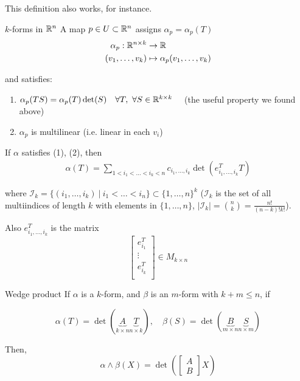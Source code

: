 \documentclass[12pt]{article}
\begin{document}
This definition also works, for instance.

\begin{definition}{$k$-forms in $\mathbb{R}^n$}{}
    A map $p \in U \subset \mathbb{R}^n$ assigns $\alpha_p = \alpha_p(T)$
    \begin{align*}
        \alpha_p: \mathbb{R}^{n \times k} &\rightarrow \mathbb{R} \\
        (v_1,\dots,v_k) &\mapsto \alpha_p(v_1,\dots,v_k) 
    \end{align*}

    and satisfies:
    \begin{enumerate}
        \item $\alpha_p(TS) = \alpha_p(T)\det(S) \quad \forall T,\ \forall S \in \mathbb{R}^{k \times k}\quad$ (the useful property we found above)
        \item $\alpha_p$ is multilinear (i.e. linear in each $v_i$)
    \end{enumerate}

    If $\alpha$ satisfies (1), (2), then
    \begin{align*}
        \alpha(T) = \sum_{1 < i_1< \dots < i_k < n} c_{i_1,\dots,i_k} \det(e_{i_1,\dots,i_k}^T T)
    \end{align*}

    where $\mathcal{I}_k = \{ (i_1,\dots,i_k)\ |\ i_1 < \dots < i_n \} \subset \{1,\dots,n\}^k$ ($\mathcal{I}_k$ is the set of all multiindices of length $k$ with elements in $\{1,\dots,n\}$, $|\mathcal{I}_k| = \binom{n}{k} = \frac{n!}{(n-k)!k!}$).

    Also $e_{i_1,\dots,i_k}^T$ is the matrix
    \[
        \begin{bmatrix}
            e_{i_1}^T \\
            \vdots \\
            e_{i_k}^T \\
        \end{bmatrix} \in M_{k \times n}
    \]
\end{definition}

\begin{definition}{Wedge product}{}
    If $\alpha$ is a $k$-form, and $\beta$ is an $m$-form with $k + m \leq n$, if

    \[
        \alpha(T) = \det(\underbrace{A}_{k \times n}\underbrace{T}_{n \times k}),\quad \beta(S) = \det(\underbrace{B}_{m \times n}\underbrace{S}_{n \times m})
    \]

    Then,
    \[
        \alpha \land \beta (X) = \det\!\left(
            \begin{bmatrix}
            A \\
            B
            \end{bmatrix}
            X
            \right)
    \]
\end{definition}
\end{document}
